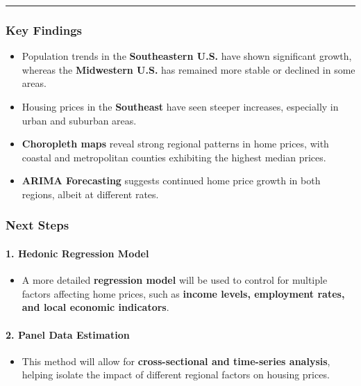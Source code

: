 \documentclass[
]{article}
\providecommand{\tightlist}{%
  \setlength{\itemsep}{0pt}\setlength{\parskip}{0pt}}
\begin{document}
\begin{center}\rule{0.5\linewidth}{0.5pt}\end{center}

\subsubsection{Key Findings}\label{key-findings}

\begin{itemize}
\tightlist
\item
  Population trends in the \textbf{Southeastern U.S.} have shown
  significant growth, whereas the \textbf{Midwestern U.S.} has remained
  more stable or declined in some areas.
\item
  Housing prices in the \textbf{Southeast} have seen steeper increases,
  especially in urban and suburban areas.
\item
  \textbf{Choropleth maps} reveal strong regional patterns in home
  prices, with coastal and metropolitan counties exhibiting the highest
  median prices.
\item
  \textbf{ARIMA Forecasting} suggests continued home price growth in
  both regions, albeit at different rates.
\end{itemize}

\subsubsection{Next Steps}\label{next-steps}

\paragraph{1. Hedonic Regression Model}\label{hedonic-regression-model}

\begin{itemize}
\tightlist
\item
  A more detailed \textbf{regression model} will be used to control for
  multiple factors affecting home prices, such as \textbf{income levels,
  employment rates, and local economic indicators}.
\end{itemize}

\paragraph{2. Panel Data Estimation}\label{panel-data-estimation}

\begin{itemize}
\tightlist
\item
  This method will allow for \textbf{cross-sectional and time-series
  analysis}, helping isolate the impact of different regional factors on
  housing prices.
\end{itemize}
\end{document}
